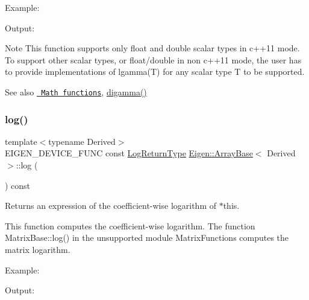 Example\+: 
\begin{DoxyCodeInclude}{0}
\end{DoxyCodeInclude}
 Output\+: 
\begin{DoxyVerbInclude}
\end{DoxyVerbInclude}


\begin{DoxyNote}{Note}
This function supports only float and double scalar types in c++11 mode. To support other scalar types, or float/double in non c++11 mode, the user has to provide implementations of lgamma(\+T) for any scalar type T to be supported.
\end{DoxyNote}
\begin{DoxySeeAlso}{See also}
\href{group__CoeffwiseMathFunctions.html\#cwisetable_lgamma}{\texttt{ Math functions}}, \mbox{\hyperlink{class_eigen_1_1_array_base_a8fe3f90b672d2c4e80bf1c74b6b088e5}{digamma()}} 
\end{DoxySeeAlso}
\mbox{\label{class_eigen_1_1_array_base_a7748ba1f6891fa4e10723a8bf77b8770}} 
\subsubsection{\texorpdfstring{log()}{log()}}
{\footnotesize\ttfamily template$<$typename Derived$>$ \\
E\+I\+G\+E\+N\+\_\+\+D\+E\+V\+I\+C\+E\+\_\+\+F\+U\+NC const \mbox{\hyperlink{class_eigen_1_1_cwise_unary_op}{Log\+Return\+Type}} \mbox{\hyperlink{class_eigen_1_1_array_base}{Eigen\+::\+Array\+Base}}$<$ Derived $>$\+::log (\begin{DoxyParamCaption}{ }\end{DoxyParamCaption}) const\hspace{0.3cm}{\ttfamily [inline]}}

\begin{DoxyReturn}{Returns}
an expression of the coefficient-\/wise logarithm of $\ast$this.
\end{DoxyReturn}
This function computes the coefficient-\/wise logarithm. The function Matrix\+Base\+::log() in the unsupported module Matrix\+Functions computes the matrix logarithm.

Example\+: 
\begin{DoxyCodeInclude}{0}
\end{DoxyCodeInclude}
 Output\+: 
\begin{DoxyVerbInclude}
\end{DoxyVerbInclude}


